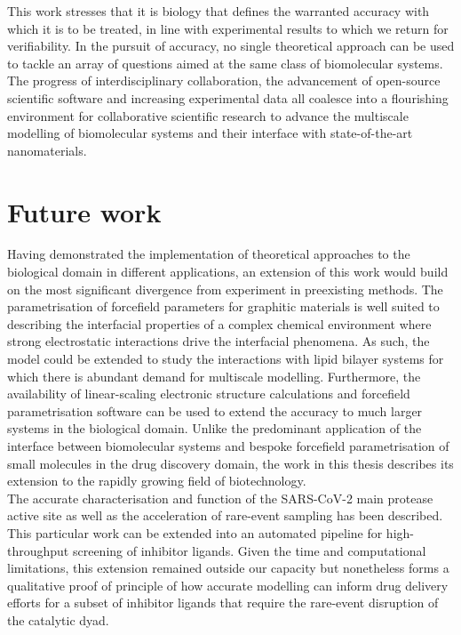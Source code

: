 This work stresses that it is biology that defines the warranted accuracy with which it is to be treated, in line with experimental results to which we return for verifiability. In the pursuit of accuracy, no single theoretical approach can be used to tackle an array of questions aimed at the same class of biomolecular systems. The progress of interdisciplinary collaboration, the advancement of open-source scientific software and increasing experimental data all coalesce into a flourishing environment for collaborative scientific research to advance the multiscale modelling of biomolecular systems and their interface with state-of-the-art nanomaterials. 

\section{Future work}

Having demonstrated the implementation of theoretical approaches to the biological domain in different applications, an extension of this work would build on the most significant divergence from experiment in preexisting methods. The parametrisation of forcefield parameters for graphitic materials is well suited to describing the interfacial properties of a complex chemical environment where strong electrostatic interactions drive the interfacial phenomena. As such, the model could be extended to study the interactions with lipid bilayer systems for which there is abundant demand for multiscale modelling. Furthermore, the availability of linear-scaling electronic structure calculations and forcefield parametrisation software can be used to extend the accuracy to much larger systems in the biological domain. Unlike the predominant application of the interface between biomolecular systems and bespoke forcefield parametrisation of small molecules in the drug discovery domain, the work in this thesis describes its extension to the rapidly growing field of biotechnology. \\

The accurate characterisation and function of the SARS-CoV-2 main protease active site as well as the acceleration of rare-event sampling has been described. This particular work can be extended into an automated pipeline for high-throughput screening of inhibitor ligands. Given the time and computational limitations, this extension remained outside our capacity but nonetheless forms a qualitative proof of principle of how accurate modelling can inform drug delivery efforts for a subset of inhibitor ligands that require the rare-event disruption of the catalytic dyad. \\

